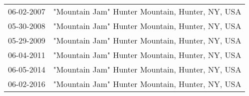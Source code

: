 \begin{supertabular}{ll}
 06-02-2007 &  "Mountain Jam" Hunter Mountain, Hunter, NY, USA \\
 05-30-2008 &  "Mountain Jam" Hunter Mountain, Hunter, NY, USA \\
 05-29-2009 &  "Mountain Jam" Hunter Mountain, Hunter, NY, USA \\
 06-04-2011 &  "Mountain Jam" Hunter Mountain, Hunter, NY, USA \\
 06-05-2014 &  "Mountain Jam" Hunter Mountain, Hunter, NY, USA \\
 06-02-2016 &  "Mountain Jam" Hunter Mountain, Hunter, NY, USA \\
\end{supertabular}
